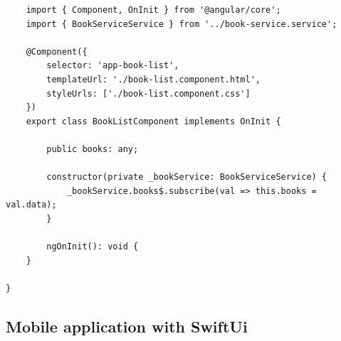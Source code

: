 \begin{lstlisting}
	import { Component, OnInit } from '@angular/core';
	import { BookServiceService } from '../book-service.service';

	@Component({
		selector: 'app-book-list',
		templateUrl: './book-list.component.html',
		styleUrls: ['./book-list.component.css']
	})
	export class BookListComponent implements OnInit {
	
		public books: any;
	
		constructor(private _bookService: BookServiceService) {
			_bookService.books$.subscribe(val => this.books = val.data);
		}
	
		ngOnInit(): void {
	}
	
}
\end{lstlisting}





\subsection{Mobile application with SwiftUi}